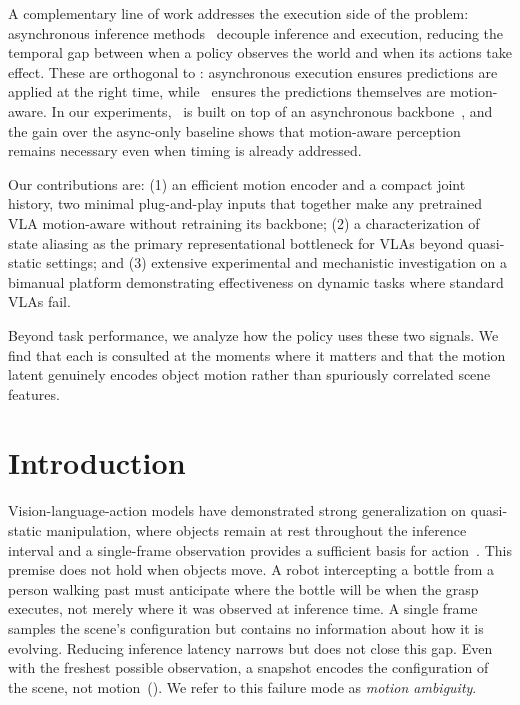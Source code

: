 A complementary line of work addresses the execution side of the problem: asynchronous inference methods~\cite{rtc, vlash} decouple inference and execution, reducing the temporal gap between when a policy observes the world and when its actions take effect. These are orthogonal to \ours: asynchronous execution ensures predictions are applied at the right time, while \ours\ ensures the predictions themselves are motion-aware. In our experiments, \ours\ is built on top of an asynchronous backbone~\cite{vlash}, and the gain over the async-only baseline shows that motion-aware perception remains necessary even when timing is already addressed.


Our contributions are: (1) an efficient motion encoder and a compact joint history, two minimal plug-and-play inputs that together make any pretrained VLA motion-aware without retraining its backbone; (2) a characterization of state aliasing as the primary representational bottleneck for VLAs beyond quasi-static settings; and (3) extensive experimental and mechanistic investigation on a bimanual platform demonstrating effectiveness on dynamic tasks where standard VLAs fail.

 Beyond task performance, we analyze how the policy uses these two signals. We find that each is consulted at the moments where it matters and that the motion latent genuinely encodes object motion rather than spuriously correlated scene features.

\fi

\section{Introduction}
\label{sec:introduction}
Vision-language-action models have demonstrated strong generalization on quasi-static manipulation, where objects remain at rest throughout the inference interval and a single-frame observation provides a sufficient basis for action~\cite{pi0, pi05, openvla}. This premise does not hold when objects move. A robot intercepting a bottle from a person walking past must anticipate where the bottle will be when the grasp executes, not merely where it was observed at inference time. A single frame samples the scene's configuration but contains no information about how it is evolving. Reducing inference latency narrows but does not close this gap. Even with the freshest possible observation, a snapshot encodes the configuration of the scene, not motion~(). We refer to this failure mode as \emph{motion ambiguity}.

